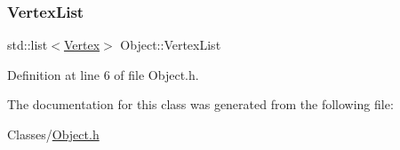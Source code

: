 \subsubsection{\texorpdfstring{Vertex\+List}{VertexList}}
{\footnotesize\ttfamily std\+::list$<$\mbox{\hyperlink{class_vertex}{Vertex}}$>$ Object\+::\+Vertex\+List}



Definition at line 6 of file Object.\+h.



The documentation for this class was generated from the following file\+:\begin{DoxyCompactItemize}
\item 
Classes/\mbox{\hyperlink{_object_8h}{Object.\+h}}\end{DoxyCompactItemize}
